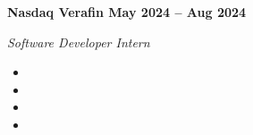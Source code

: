 \vspace{0.1cm}
\textbf{Nasdaq Verafin \hfill May 2024 -- Aug 2024} \par
\textit{Software Developer Intern} \par
\begin{itemize}
	\item
  \item 
  \item 
  \item 
\end{itemize} \par